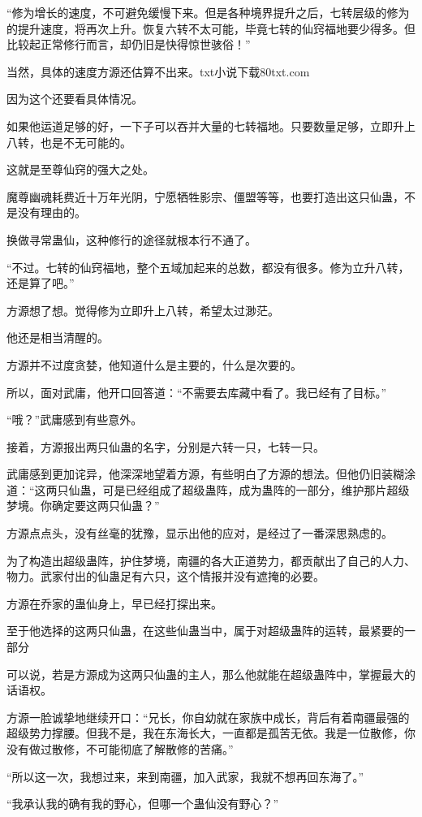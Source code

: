 \begin{this_body}
“修为增长的速度，不可避免缓慢下来。但是各种境界提升之后，七转层级的修为的提升速度，将再次上升。恢复六转不太可能，毕竟七转的仙窍福地要少得多。但比较起正常修行而言，却仍旧是快得惊世骇俗！”

当然，具体的速度方源还估算不出来。txt小说下载80txt.com

因为这个还要看具体情况。

如果他运道足够的好，一下子可以吞并大量的七转福地。只要数量足够，立即升上八转，也是不无可能的。

这就是至尊仙窍的强大之处。

魔尊幽魂耗费近十万年光阴，宁愿牺牲影宗、僵盟等等，也要打造出这只仙蛊，不是没有理由的。

换做寻常蛊仙，这种修行的途径就根本行不通了。

“不过。七转的仙窍福地，整个五域加起来的总数，都没有很多。修为立升八转，还是算了吧。”

方源想了想。觉得修为立即升上八转，希望太过渺茫。

他还是相当清醒的。

方源并不过度贪婪，他知道什么是主要的，什么是次要的。

所以，面对武庸，他开口回答道：“不需要去库藏中看了。我已经有了目标。”

“哦？”武庸感到有些意外。

接着，方源报出两只仙蛊的名字，分别是六转一只，七转一只。

武庸感到更加诧异，他深深地望着方源，有些明白了方源的想法。但他仍旧装糊涂道：“这两只仙蛊，可是已经组成了超级蛊阵，成为蛊阵的一部分，维护那片超级梦境。你确定要这两只仙蛊？”

方源点点头，没有丝毫的犹豫，显示出他的应对，是经过了一番深思熟虑的。

为了构造出超级蛊阵，护住梦境，南疆的各大正道势力，都贡献出了自己的人力、物力。武家付出的仙蛊足有六只，这个情报并没有遮掩的必要。

方源在乔家的蛊仙身上，早已经打探出来。

至于他选择的这两只仙蛊，在这些仙蛊当中，属于对超级蛊阵的运转，最紧要的一部分

可以说，若是方源成为这两只仙蛊的主人，那么他就能在超级蛊阵中，掌握最大的话语权。

方源一脸诚挚地继续开口：“兄长，你自幼就在家族中成长，背后有着南疆最强的超级势力撑腰。但我不是，我在东海长大，一直都是孤苦无依。我是一位散修，你没有做过散修，不可能彻底了解散修的苦痛。”

“所以这一次，我想过来，来到南疆，加入武家，我就不想再回东海了。”

“我承认我的确有我的野心，但哪一个蛊仙没有野心？”


\end{this_body}
